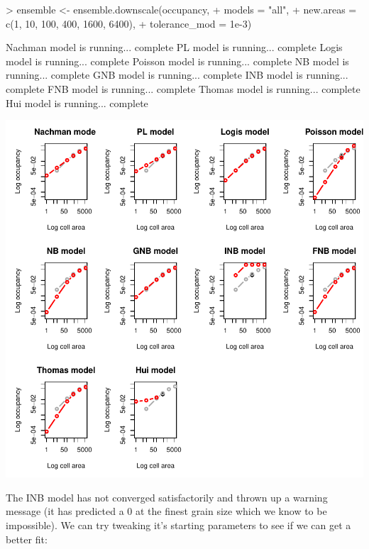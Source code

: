 \documentclass{article}[12pt, a4paper]
\begin{document}
\begin{Schunk}
\begin{Sinput}
> ensemble <- ensemble.downscale(occupancy,
+                                models = "all",
+                                new.areas = c(1, 10, 100, 400, 1600, 6400),
+                                tolerance_mod = 1e-3)
\end{Sinput}
\begin{Soutput}
Nachman model is running...  complete 
PL model is running...  complete 
Logis model is running...  complete 
Poisson model is running...  complete 
NB model is running...  complete 
GNB model is running...  complete 
INB model is running...  complete 
FNB model is running...  complete 
Thomas model is running...  complete 
Hui model is running...  complete 

\end{Soutput}
\end{Schunk}
\includegraphics{Downscaling-downscale35}

The INB model has not converged satisfactorily and thrown up a warning message (it has predicted a 0 at the finest grain size which we know to be impossible). We can try tweaking it’s starting parameters to see if we can get a better fit:
\end{document}
